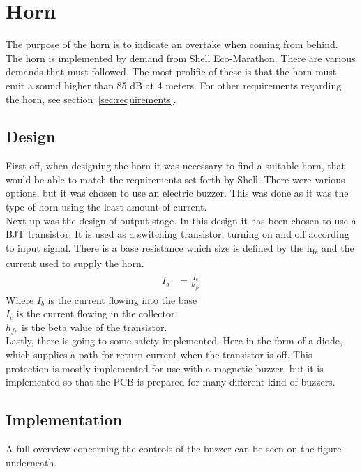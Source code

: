 \section{Horn}
The purpose of the horn is to indicate an overtake when coming from behind. The horn is implemented by demand from Shell Eco-Marathon. There are various demands that must followed. The most prolific of these is that the horn must emit a sound higher than 85 dB at 4 meters. For other requirements regarding the horn, see section~\vref{sec:requirements}.  

\subsection{Design}
First off, when designing the horn it was necessary to find a suitable horn, that would be able to match the requirements set forth by Shell. There were various options, but it was chosen to use an electric buzzer. This was done as it was the type of horn using the least amount of current. \\
Next up was the design of output stage. In this design it has been chosen to use a BJT transistor. It is used as a switching transistor, turning on and off according to input signal. There is a base resistance which size is defined by the h\textsubscript{fe} and the current used to supply the horn. \\
\begin{align}
	\begin{split}
		I_b &= \frac{I_c}{h_{fe}}
	\end{split}
\end{align}
Where $I_b$ is the current flowing into the base \\ 
$I_c$ is the current flowing in the collector \\ 
$h_{fe}$ is the beta value of the transistor. \\

Lastly, there is going to some safety implemented. Here in the form of a diode, which supplies a path for return current when the transistor is off. This protection is mostly implemented for use with a magnetic buzzer, but it is implemented so that the PCB is prepared for many different kind of buzzers.   

\subsection{Implementation}
A full overview concerning the controls of the buzzer can be seen on the figure underneath.

